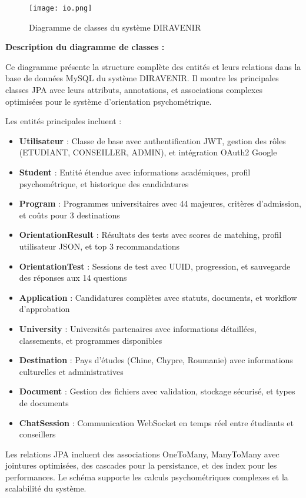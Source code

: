 \documentclass[12pt,a4paper]{report}
\begin{document}
\begin{figure}[H]
\centering
\texttt{[image: io.png]}
\caption{Diagramme de classes du système DIRAVENIR}
\label{fig:diagramme_classes}
\end{figure}

\textbf{Description du diagramme de classes :}

Ce diagramme présente la structure complète des entités et leurs relations dans la base de données MySQL du système DIRAVENIR. Il montre les principales classes JPA avec leurs attributs, annotations, et associations complexes optimisées pour le système d'orientation psychométrique.

Les entités principales incluent :
\begin{itemize}
    \item \textbf{Utilisateur} : Classe de base avec authentification JWT, gestion des rôles (ETUDIANT, CONSEILLER, ADMIN), et intégration OAuth2 Google
    \item \textbf{Student} : Entité étendue avec informations académiques, profil psychométrique, et historique des candidatures
    \item \textbf{Program} : Programmes universitaires avec 44 majeures, critères d'admission, et coûts pour 3 destinations
    \item \textbf{OrientationResult} : Résultats des tests avec scores de matching, profil utilisateur JSON, et top 3 recommandations
    \item \textbf{OrientationTest} : Sessions de test avec UUID, progression, et sauvegarde des réponses aux 14 questions
    \item \textbf{Application} : Candidatures complètes avec statuts, documents, et workflow d'approbation
    \item \textbf{University} : Universités partenaires avec informations détaillées, classements, et programmes disponibles
    \item \textbf{Destination} : Pays d'études (Chine, Chypre, Roumanie) avec informations culturelles et administratives
    \item \textbf{Document} : Gestion des fichiers avec validation, stockage sécurisé, et types de documents
    \item \textbf{ChatSession} : Communication WebSocket en temps réel entre étudiants et conseillers
\end{itemize}

Les relations JPA incluent des associations OneToMany, ManyToMany avec jointures optimisées, des cascades pour la persistance, et des index pour les performances. Le schéma supporte les calculs psychométriques complexes et la scalabilité du système.
\end{document}
